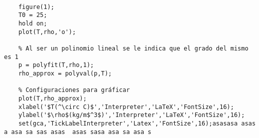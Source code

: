 \begin{verbatim}

    figure(1);
    T0 = 25;
    hold on;
    plot(T,rho,'o');
    
    % Al ser un polinomio lineal se le indica que el grado del mismo es 1
    p = polyfit(T,rho,1);
    rho_approx = polyval(p,T);
    
    % Configuraciones para gráficar
    plot(T,rho_approx);
    xlabel('$T(^\circ C)$','Interpreter','LaTeX','FontSize',16);
    ylabel('$\rho$(kg/m$^3$)','Interpreter','LaTeX','FontSize',16);
    set(gca,'TickLabelInterpreter','Latex','FontSize',16);asasasa asas a asa sa sas asas  asas sasa asa sa asa s
    
    
\end{verbatim}